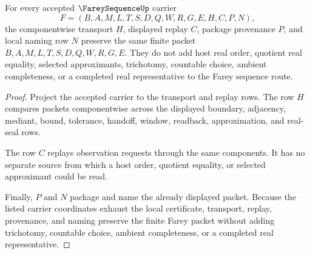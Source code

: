 \begin{theorem}
\label{thm:farey-sequence-local-naming-replay-scope}
For every accepted $\FareySequenceUp$ carrier
$$
F=(B,A,M,L,T,S,D,Q,W,R,G,E,H,C,P,N),
$$
the componentwise transport $H$, displayed replay $C$, package provenance $P$, and local naming row $N$ preserve the same finite packet $B,A,M,L,T,S,D,Q,W,R,G,E$. They do not add host real order, quotient real equality, selected approximants, trichotomy, countable choice, ambient completeness, or a completed real representative to the Farey sequence route.
\end{theorem}
\begin{proof}
Project the accepted carrier to the transport and replay rows. The row $H$ compares packets componentwise across the displayed boundary, adjacency, mediant, bound, tolerance, handoff, window, readback, approximation, and real-seal rows.

The row $C$ replays observation requests through the same components. It has no separate source from which a host order, quotient equality, or selected approximant could be read.

Finally, $P$ and $N$ package and name the already displayed packet. Because the listed carrier coordinates exhaust the local certificate, transport, replay, provenance, and naming preserve the finite Farey packet without adding trichotomy, countable choice, ambient completeness, or a completed real representative.
\end{proof}

